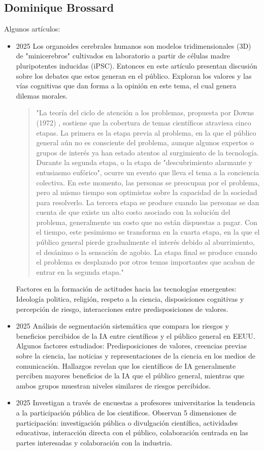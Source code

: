 \documentclass[11pt,                                                            
 superscriptaddress,twoside,
 amsmath,amssymb,
 aps, physrev
]{revtex4-2}
\begin{document}
\subsection{Dominique Brossard}
Algunos artículos:
\begin{itemize}
	\item 2025 \cite{Villanueva2025} Los organoides cerebrales humanos son modelos tridimensionales (3D) de "minicerebros" cultivados en laboratorio a partir de células madre pluripotentes inducidas (iPSC). 
	Entonces en este artículo presentan discusión sobre los debates que estos generan en el público. Exploran los valores y las vías cognitivas que dan forma a la opinión en este tema, el cual genera dilemas morales. 
	\begin{quote}
		"La teoría del ciclo de atención a los problemas, propuesta por Downs (1972) , sostiene que la cobertura de temas científicos atraviesa cinco etapas. La primera es la etapa previa al problema, en la que el público general aún no es consciente del problema, aunque algunos expertos o grupos de interés ya han estado atentos al surgimiento de la tecnología. Durante la segunda etapa, o la etapa de "descubrimiento alarmante y entusiasmo eufórico", ocurre un evento que lleva el tema a la conciencia colectiva. En este momento, las personas se preocupan por el problema, pero al mismo tiempo son optimistas sobre la capacidad de la sociedad para resolverlo. La tercera etapa se produce cuando las personas se dan cuenta de que existe un alto costo asociado con la solución del problema, generalmente un costo que no están dispuestas a pagar. Con el tiempo, este pesimismo se transforma en la cuarta etapa, en la que el público general pierde gradualmente el interés debido al aburrimiento, el desánimo o la sensación de agobio. La etapa final se produce cuando el problema es desplazado por otros temas importantes que acaban de entrar en la segunda etapa."
	\end{quote}
	Factores en la formación de actitudes hacia las tecnologías emergentes: Ideología politica, religión, respeto a la ciencia, disposiciones cognitivas y percepción de riesgo, interacciones entre predisposiciones de valores.
	
	\item 2025 \cite{Bao2025} Análisis de segmentación sistemática que compara los riesgos y beneficios percibidos de la IA entre científicos y el público general en EEUU. Algunos factores estudiados: Predisposiciones de valores, creencias previas sobre la ciencia,  las noticias y representaciones de la ciencia en los medios de comunicación. Hallazgos revelan que los científicos de IA generalmente perciben mayores beneficios de la IA que el público general, mientras que ambos grupos muestran niveles similares de riesgos percibidos.
	\item 2025 \cite{Beets2025} Investigan a través de encuestas a profesores universitarios la tendencia a la participación pública de los cientificos. Observan 5 dimensiones de participación: investigación pública o divulgación científica, actividades educativas, interacción directa con el público, colaboración centrada en las partes interesadas y colaboración con la industria. 
\end{itemize}
\end{document}
